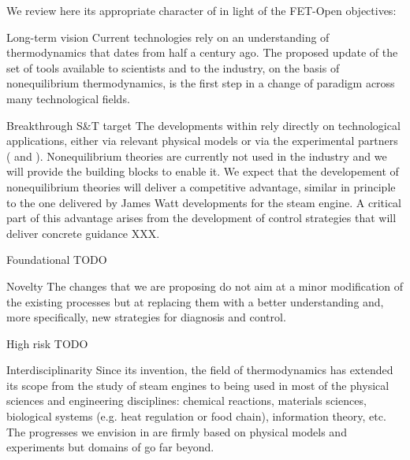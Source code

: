 We review here its appropriate character of \TheProject in light of the FET-Open objectives:
\begin{compactdesc}
\item[Long-term vision] Current technologies rely on an understanding of thermodynamics that
dates from half a century ago. The proposed update of the set of tools available to
scientists and to the industry, on the basis of nonequilibrium thermodynamics, is the first
step in a change of paradigm across many technological fields.
\item[Breakthrough S\&T target] The developments within \TheProject rely directly on
technological applications, either via relevant physical models or via the experimental
partners ( and ). Nonequilibrium theories are currently not used in
the industry and we will provide the building blocks to enable it. We expect that the
developement of nonequilibrium theories will deliver a competitive advantage, similar in
principle to the one delivered by James Watt developments for the steam engine.
%
A critical part of this advantage arises from the development of control strategies that
will deliver concrete guidance XXX.
\item[Foundational] TODO
\item[Novelty] The changes that we are proposing do not aim at a minor modification of the
existing processes but at replacing them with a better understanding and, more specifically,
new strategies for diagnosis and control.
\item[High risk] TODO
\item[Interdisciplinarity] Since its invention, the field of thermodynamics has extended its
scope from the study of steam engines to being used in most of the physical sciences and
engineering disciplines: chemical reactions, materials sciences, biological systems
(e.g. heat regulation or food chain), information theory, etc. The progresses we envision in
\TheProject are firmly based on physical models and experiments but domains of go far beyond.
\end{compactdesc}

